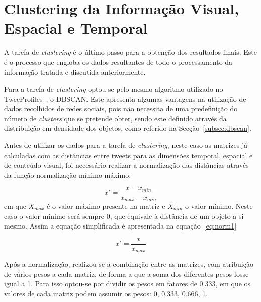 
\section{Clustering da Informação Visual, Espacial e Temporal} \label{sec:finalclustering}

A tarefa de \textit{clustering} é o último passo para a obtenção dos resultados finais. Este é o processo que engloba os dados resultantes de todo o processamento da informação tratada e discutida anteriormente.

Para a tarefa de \textit{clustering} optou-se pelo mesmo algoritmo utilizado no TweeProfiles~\cite{Cunha2013}, o DBSCAN. Este apresenta algumas vantagens na utilização de dados recolhidos de redes sociais, pois não necessita de uma predefinição do número de \textit{clusters} que se pretende obter, sendo este definido através da distribuição em densidade dos objetos, como referido na Secção~\ref{subsec:dbscan}.

Antes de utilizar os dados para a tarefa de \textit{clustering}, neste caso as matrizes já calculadas com as distâncias entre tweets para as dimensões temporal, espacial e de conteúdo visual, foi necessário realizar a normalização das distâncias através da função normalização mínimo-máximo:

\begin{equation}
x' = \frac{x - x_{min} }{x_{max} - x_{min} }
\label{eq:norm}
\end{equation}
em que $ X_{max} $ é o valor máximo presente na matriz e $ X_{min} $ o valor mínimo. Neste caso o valor mínimo será sempre 0, que equivale à distância de um objeto a si mesmo. Assim a equação simplificada é apresentada na equação~\ref{eq:norm1}

\begin{equation}
x' = \frac{x}{x_{max}}
\label{eq:norm1}
\end{equation}

Após a normalização, realizou-se a combinação entre as matrizes, com atribuição de vários pesos a cada matriz, de forma a que a soma dos diferentes pesos fosse igual a 1. Para isso optou-se por dividir os pesos em fatores de 0.333, em que os valores de cada matriz podem assumir os pesos: 0, 0.333, 0.666, 1.

